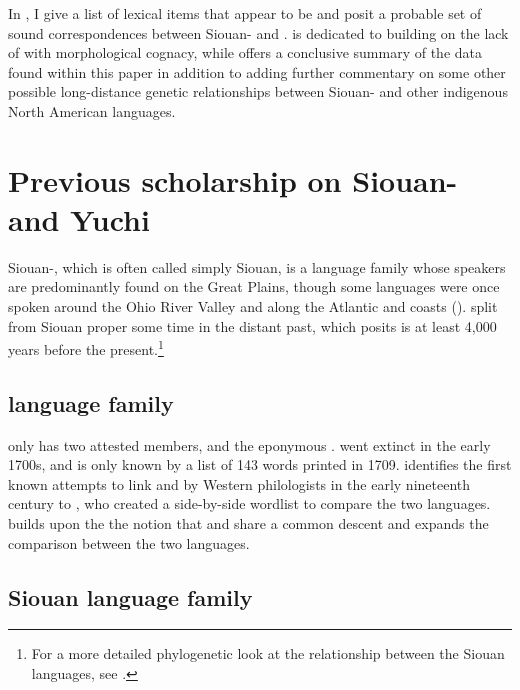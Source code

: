 \documentclass[output=paper]{LSP/langsci}
\begin{document}
In , I give a list of lexical items that appear to be  and posit a probable set of sound correspondences between Siouan- and .  is dedicated to building on the lack of  with morphological cognacy, while  offers a conclusive summary of the data found within this paper in addition to adding further commentary on some other possible long-distance genetic relationships between Siouan- and other indigenous North American languages.

\section{Previous scholarship on Siouan- and Yuchi}\label{sec:kasak:2}

Siouan-, which is often called simply Siouan, is a language family whose speakers are predominantly found on the Great Plains, though some languages were once spoken around the Ohio River Valley and along the Atlantic and  coasts (\citealt{Mithun1999}).  split from Siouan proper some time in the distant past, which \citet{Rankin1996} posits is at least 4,000 years before the present.\footnote{For a more detailed phylogenetic look at the relationship between the Siouan languages, see \citet{Rankin2010}.}

\subsection{ language family}

 only has two attested members,  and the eponymous .  went extinct in the early 1700s, and is only known by a list of 143 words printed in 1709. \citet{Carter1980} identifies the first known attempts to link  and  by Western philologists in the early nineteenth century to  \citet{AdelungVater1816}, who created a side-by-side wordlist to compare the two languages. \citet{Gallatin1836} builds upon the the notion that  and  share a common descent and expands the comparison between the two languages.

\subsection{Siouan language family}
\end{document}
